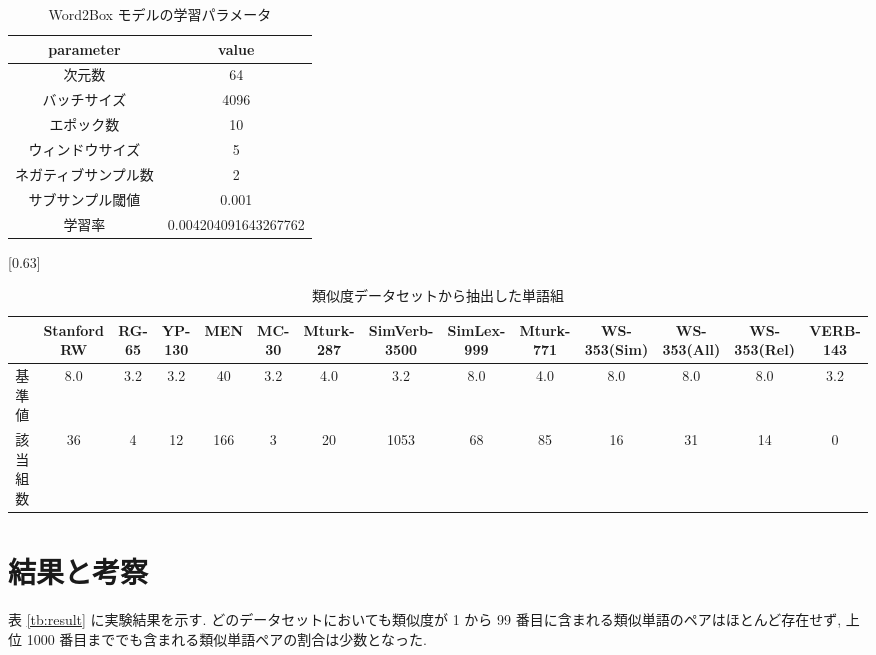 \documentclass[twocolumn]{jarticle}     %
\begin{document}
\begin{table}[th]
  \centering
  \caption{Word2Box モデルの学習パラメータ}
  \label{tb:model_parameter}
  \begin{tabular}{c|c} \hline
      parameter&value \\ \hline
      次元数&64 \\
      バッチサイズ&4096 \\ 
      エポック数&10 \\
      ウィンドウサイズ&5 \\
      ネガティブサンプル数&2 \\
      サブサンプル閾値&0.001 \\
      学習率&0.004204091643267762 \\
      \hline
  \end{tabular}
\end{table}

\begin{table}[th]
  \centering
  \caption{類似度データセットから抽出した単語組}
  \label{tb:dataset_detail}
  \scalebox{0.63}[0.63]{
		\begin{tabular}{c|ccccccccccccc}
			\hline
			
      & Stanford RW & RG-65 & YP-130 & MEN & MC-30 & Mturk-287 & SimVerb-3500 & SimLex-999 & Mturk-771 & WS-353(Sim) & WS-353(All) & WS-353(Rel) & VERB-143 \\ \hline
			基準値  & 8.0         & 3.2   & 3.2    & 40  & 3.2   & 4.0       & 3.2          & 8.0        & 4.0       & 8.0         & 8.0         & 8.0         & 3.2      \\
			該当組数 & 36          & 4     & 12     & 166 & 3     & 20        & 1053         & 68         & 85        & 16          & 31          & 14          & 0        \\ \hline
			\end{tabular}
  }
\end{table}

\section{結果と考察}
表 \ref{tb:result} に実験結果を示す. 
どのデータセットにおいても類似度が 1 から 99 番目に含まれる類似単語のペアはほとんど存在せず, 上位 1000 番目まででも含まれる類似単語ペアの割合は少数となった. 
\end{document}
